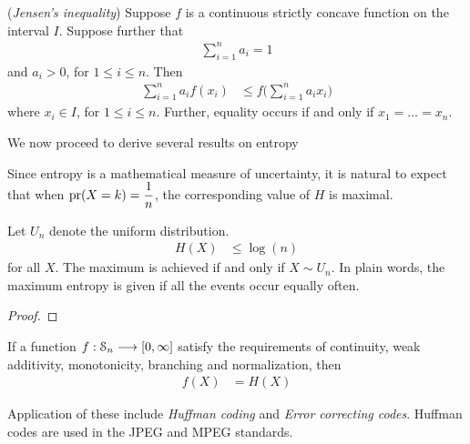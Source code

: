 \documentclass[a4paper, 12pt]{book} %
\begin{document}
\begin{theorem}
    (\emph{Jensen's inequality}) Suppose $f$ is a continuous strictly concave function on the interval $I$. Suppose further that
    \begin{align}
        \sum_{i=1}^n a_i = 1
    \end{align}
    and $a_i > 0$, for $1 \leq i \leq n$. Then 
    \begin{align}
        \sum_{i=1}^n a_i f(x_i) &\leq f\bigg( \sum_{i=1}^n a_i x_i\bigg)
    \end{align}
    where $x_i \in I$, for $1 \leq i \leq n$. Further, equality occurs if and only if $x_1 = \ldots = x_n$.
\end{theorem}
We now proceed to derive several results on entropy

Since entropy is a mathematical measure of uncertainty, it is natural to
expect that when $\operatorname{pr}(X =k) = \dfrac{1}{n}$, the corresponding value of $H$ is maximal.
\begin{proposition}
    Let $U_n$ denote the uniform distribution. 
    \begin{align}
        H(X) &\leq \log(n) 
    \end{align}
    for all $X$. The maximum is achieved if and only if $X \sim U_n$. In plain words, the maximum entropy is given if all the events occur equally often.
\end{proposition}
\begin{proof}
    
\end{proof}

\begin{proposition}
If a function $f: \EuScript{S}_n \longrightarrow [0, \infty]$ satisfy the requirements of continuity, weak additivity, monotonicity, branching and normalization, then
\begin{align}
    f(X) &= H(X)
\end{align}
\end{proposition}

Application of these include \emph{Huffman coding} and \emph{Error correcting codes}. Huffman codes are used in the JPEG and MPEG standards.
\end{document}
